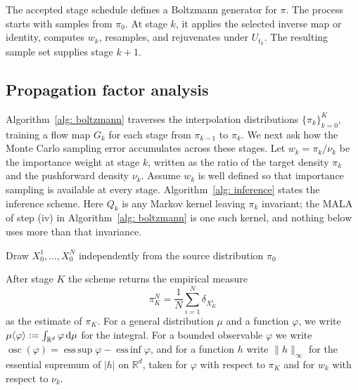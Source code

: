 \documentclass{article}
\begin{document}
The accepted stage schedule defines a Boltzmann generator for $\pi$. The process starts with samples from $\pi_0$. At stage $k$, it applies the selected inverse map or identity, computes $w_k$, resamples, and rejuvenates under $U_{t_k}$. The resulting sample set supplies stage $k+1$.

\subsection{Propagation factor analysis}
\label{sec: propagation-analysis}

Algorithm~\ref{alg: boltzmann} traverses the interpolation distributions $\{\pi_k\}_{k=0}^K$, training a flow map $G_k$ for each stage from $\pi_{k-1}$ to $\pi_k$. We next ask how the Monte Carlo sampling error accumulates across these stages. Let $w_k = \pi_k/\nu_k$ be the importance weight at stage $k$, written as the ratio of the target density $\pi_k$ and the pushforward density $\nu_k$. Assume $w_k$ is well defined so that importance sampling is available at every stage. Algorithm~\ref{alg: inference} states the inference scheme. Here $Q_k$ is any Markov kernel leaving $\pi_k$ invariant; the MALA of step (iv) in Algorithm~\ref{alg: boltzmann} is one such kernel, and nothing below uses more than that invariance.

\begin{algorithm}[htb]

\caption{Inference scheme of the Boltzmann generator}
\label{alg: inference}
Draw $X_0^1,\dots,X_0^N$ independently from the source distribution $\pi_0$\;
\end{algorithm}

After stage $K$ the scheme returns the empirical measure
\begin{equation}
	\pi_K^N = \frac1N\sum_{i=1}^{N} \delta_{X_K^i}
\end{equation}
as the estimate of $\pi_K$. For a general distribution $\mu$ and a function $\varphi$, we write $\mu\langle \varphi\rangle := \int_{\mathbb R^d} \varphi \, \mathrm{d}\mu$ for the integral. For a bounded observable $\varphi$ we write $\operatorname{osc}(\varphi) = \operatorname{ess\,sup}\varphi - \operatorname{ess\,inf}\varphi$, and for a function $h$ write $\lVert h \rVert_\infty$ for the essential supremum of $|h|$ on $\mathbb R^d$, taken for $\varphi$ with respect to $\pi_K$ and for $w_k$ with respect to $\nu_k$.
\end{document}
